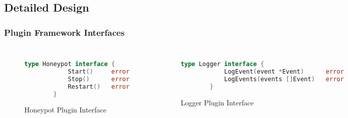 \subsection{Detailed Design}
\begin{frame}[fragile]
\frametitle{Plugin Framework Interfaces}

\begin{columns}[c]

\begin{figure}
\begin{lstlisting}[language=go,showstringspaces=false]
        type Honeypot interface {
            Start()     error
            Stop()      error
            Restart()   error
        }
\end{lstlisting}
\caption{Honeypot Plugin Interface}
\end{figure}

\begin{figure}
\begin{lstlisting}[language=go,showstringspaces=false]
        type Logger interface {
            LogEvent(event *Event)      error
            LogEvents(events []Event)   error
        }
\end{lstlisting}
\caption{Logger Plugin Interface}
\end{figure}

\end{columns}
\end{frame}

